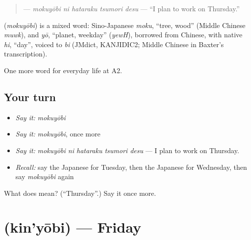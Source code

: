\begin{quote}
\textbf{  } — \emph{mokuyōbi ni hataraku tsumori desu} — \textquotedblleft{}I plan to work on Thursday.\textquotedblright{}
\end{quote}

\begin{cousinweb}
\textbf{} (\emph{mokuyōbi}) is a mixed word: Sino-Japanese \emph{moku}, \textquotedblleft{}tree, wood\textquotedblright{} (Middle Chinese \emph{muwk}), and \emph{yō}, \textquotedblleft{}planet, weekday\textquotedblright{} (\emph{yewH}), borrowed from Chinese, with native \emph{hi}, \textquotedblleft{}day\textquotedblright{}, voiced to \emph{bi} (JMdict, KANJIDIC2; Middle Chinese in Baxter's transcription).
\end{cousinweb}

\begin{grammarlens}[title={What you've built}]
One more word for everyday life at A2.
\end{grammarlens}

\subsection*{Your turn}
\begin{itemize}
\raggedright
  \item \emph{Say it:} \emph{mokuyōbi}
  \item \emph{Say it:} \emph{mokuyōbi}, once more
  \item \emph{Say it:} \emph{mokuyōbi ni hataraku tsumori desu} — I plan to work on Thursday.
  \item \emph{Recall:} say the Japanese for Tuesday, then the Japanese for Wednesday, then say \emph{mokuyōbi} again
\end{itemize}

\begin{tcolorbox}[breakable,colback=teal!4,colframe=teal!35!black,title={Before you move on}]
What does  mean? (\textquotedblleft{}Thursday\textquotedblright{}.) Say it once more.
\end{tcolorbox}
\section[\texorpdfstring{\ja{きんようび} (kin'yōbi)}{きんようび (kin'yōbi)}]{ (kin'yōbi) — Friday}

\label{lesson:JA-C164-kinyoubi}



